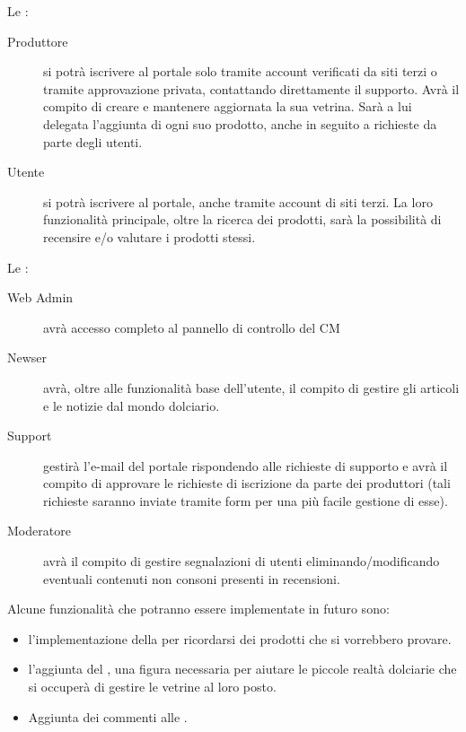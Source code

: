 \begin{description}
	\item Le : 
			\begin{description}
				\item[Produttore] si potrà iscrivere al portale solo tramite account verificati da siti terzi o tramite approvazione privata, contattando direttamente il supporto. Avrà il compito di creare e mantenere aggiornata la sua vetrina. Sarà a lui delegata l’aggiunta di ogni suo prodotto, anche in seguito a richieste da parte degli utenti.
				
				\item[Utente] si potrà iscrivere al portale, anche tramite account di siti terzi. La loro funzionalità principale, oltre la ricerca dei prodotti, sarà la possibilità di recensire e/o valutare i prodotti stessi. 
			\end{description}
			
	\item Le :
			\begin{description}
				\item[Web Admin] avrà accesso completo al pannello di controllo del CM
				
				\item[Newser] avrà, oltre alle funzionalità base dell’utente, il compito di gestire gli articoli e le notizie dal mondo dolciario.
				
				\item[Support] gestirà l’e-mail del portale rispondendo alle richieste di supporto e avrà il compito di approvare le richieste di iscrizione da parte dei produttori (tali richieste saranno inviate tramite form per una più facile gestione di esse).
				
				\item[Moderatore] avrà il compito di gestire segnalazioni di utenti eliminando/modificando eventuali contenuti non consoni presenti in recensioni.
			\end{description}
\end{description}

Alcune funzionalità che potranno essere implementate in futuro sono: 
\begin{itemize}
	\item l’implementazione della  per ricordarsi dei prodotti che si vorrebbero provare.

	\item l’aggiunta del , una figura necessaria per aiutare le piccole realtà dolciarie che si occuperà di gestire le vetrine al loro posto.

	\item Aggiunta dei commenti alle .
\end{itemize}

